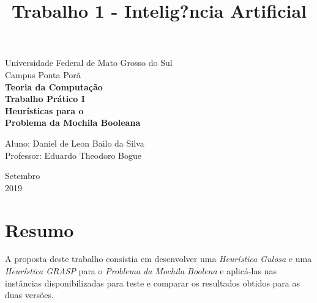 \documentclass[a4paper, 12pt]{article}
\title{Trabalho 1 - Intelig?ncia Artificial}
\begin{document}
\begin{titlepage}
    \begin{center}
		\LARGE{Universidade Federal de Mato Grosso do Sul}\\
		\vspace{5pt}
        \large{Campus Ponta Porã}\\ 
        \large{{\textbf{Teoria da Computação}}}\\ 
        \vspace{15pt}
        \vspace{95pt}
        \textbf{\large{Trabalho Prático I}}\\
        \vspace{15pt}
        \textbf{\LARGE{Heurísticas para o \\Problema da Mochila Booleana}}\\
        \vspace{5cm}
    \end{center}
    
    \begin{flushleft}
        \begin{tabbing}
            Aluno: Daniel de Leon Bailo da Silva\\            
            Professor: Eduardo Theodoro Bogue\\
    \end{tabbing}
 \end{flushleft}
    \vspace{1cm}
    
    \begin{center}
        \vspace{\fill}
            Setembro\\
         2019
            \end{center}
\end{titlepage}

\clearpage
\tableofcontents
\thispagestyle{empty}
\clearpage


\section*{Resumo}
A proposta deste trabalho consistia em desenvolver uma \textit{Heurística Gulosa} e uma \textit{Heurística GRASP}
para o \textit{Problema da Mochila Boolena} e aplicá-las nas instâncias disponibilizadas para teste e 
comparar os resultados obtidos para as duas versões.
\end{document}
